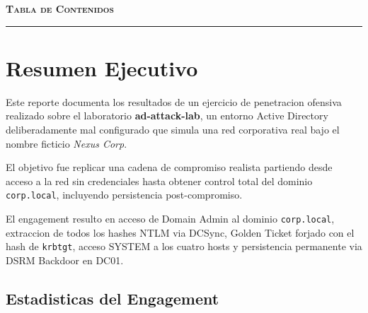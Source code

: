 \documentclass[11pt,a4paper]{article}
\begin{document}
\nopagecolor
{}
\setcounter{page}{1}

\thispagestyle{empty}
\begin{center}
{\large\bfseries\scshape\color{accentbluedark} Tabla de Contenidos}\\[0.3cm]
{\color{accentblue}\rule{4cm}{0.5pt}}
\end{center}
\vspace{0.3cm}
\tableofcontents
\newpage

\section{Resumen Ejecutivo}

Este reporte documenta los resultados de un ejercicio de penetracion ofensiva
realizado sobre el laboratorio \textbf{ad-attack-lab}, un entorno Active Directory
deliberadamente mal configurado que simula una red corporativa real bajo el
nombre ficticio \emph{Nexus Corp}.

El objetivo fue replicar una cadena de compromiso realista partiendo desde
acceso a la red sin credenciales hasta obtener control total del dominio
\texttt{corp.local}, incluyendo persistencia post-compromiso.

\vspace{0.4cm}

\begin{tcolorbox}[colback=critical!8, colframe=critical, boxrule=1pt, arc=3pt,
  title={\textbf{Dominio Completamente Comprometido}},
  fonttitle=\bfseries\color{white}, coltitle=white, colbacktitle=critical]
El engagement resulto en acceso de Domain Admin al dominio \texttt{corp.local},
extraccion de todos los hashes NTLM via DCSync, Golden Ticket forjado con el
hash de \texttt{krbtgt}, acceso SYSTEM a los cuatro hosts y persistencia
permanente via DSRM Backdoor en DC01.
\end{tcolorbox}

\vspace{0.4cm}

\subsection*{Estadisticas del Engagement}
\end{document}
